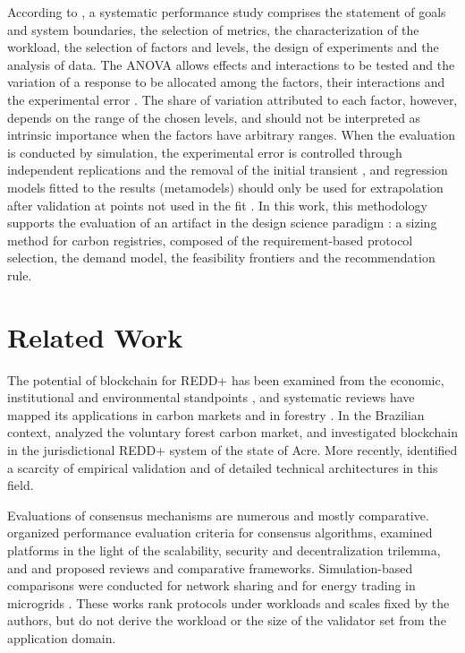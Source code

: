 \documentclass[english]{sbc2025}%
\begin{document}
According to \citet{Jain1991}, a systematic performance study comprises the statement of goals and system boundaries, the selection of metrics, the characterization of the workload, the selection of factors and levels, the design of experiments and the analysis of data. The ANOVA allows effects and interactions to be tested and the variation of a response to be allocated among the factors, their interactions and the experimental error \citep{Jain1991,Montgomery2017}. The share of variation attributed to each factor, however, depends on the range of the chosen levels, and should not be interpreted as intrinsic importance when the factors have arbitrary ranges. When the evaluation is conducted by simulation, the experimental error is controlled through independent replications and the removal of the initial transient \citep{Law2015}, and regression models fitted to the results (metamodels) should only be used for extrapolation after validation at points not used in the fit \citep{Kleijnen2015}. In this work, this methodology supports the evaluation of an artifact in the design science paradigm \citep{Hevner2004}: a sizing method for carbon registries, composed of the requirement-based protocol selection, the demand model, the feasibility frontiers and the recommendation rule.

\section{Related Work}
\label{sec:related}

The potential of blockchain for REDD+ has been examined from the economic, institutional and environmental standpoints \citep{Howson2019geoforum,Kotsialou2021,Kotsialou2022,Marke2022,Pak2021}, and systematic reviews have mapped its applications in carbon markets and in forestry \citep{Vilkov2023,He2022}. In the Brazilian context, \citet{Aguiar2018} analyzed the voluntary forest carbon market, and \citet{Neves2025} investigated blockchain in the jurisdictional REDD+ system of the state of Acre. More recently, \citet{Caburlao2026fsi} identified a scarcity of empirical validation and of detailed technical architectures in this field.

Evaluations of consensus mechanisms are numerous and mostly comparative. \citet{Bamakan2020} organized performance evaluation criteria for consensus algorithms, \citet{Werth2023} examined platforms in the light of the scalability, security and decentralization trilemma, and \citet{Shen2025} and \citet{Shaikh2025} proposed reviews and comparative frameworks. Simulation-based comparisons were conducted for network sharing \citep{Zeydan2026} and for energy trading in microgrids \citep{Bhavana2025}. These works rank protocols under workloads and scales fixed by the authors, but do not derive the workload or the size of the validator set from the application domain.
\end{document}
